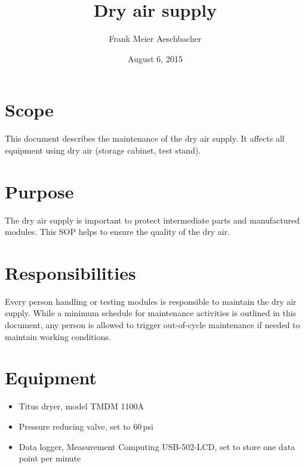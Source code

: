\documentclass[12pt]{unlsilabsop}
\title{Dry air supply}
\date{August 6, 2015}
\author{Frank Meier Aeschbacher}
\begin{document}
\maketitle

\section{Scope}
This document describes the maintenance of the dry air supply. It affects all equipment using dry air (storage cabinet, test stand).

\section{Purpose}
The dry air supply is important to protect intermediate parts and manufactured modules. This SOP helps to ensure the quality of the dry air.


\section{Responsibilities}
Every person handling or testing modules is responsible to maintain the dry air supply. While a minimum schedule for maintenance activities is outlined in this document, any person is allowed to trigger out-of-cycle maintenance if needed to maintain working conditions.

\section{Equipment}

\begin{itemize}
    \item Titus dryer, model TMDM 1100A
    \item Pressure reducing valve, set to 60\,psi
    \item Data logger, Measurement Computing USB-502-LCD, set to store one data point per minute
\end{itemize}
\end{document}
